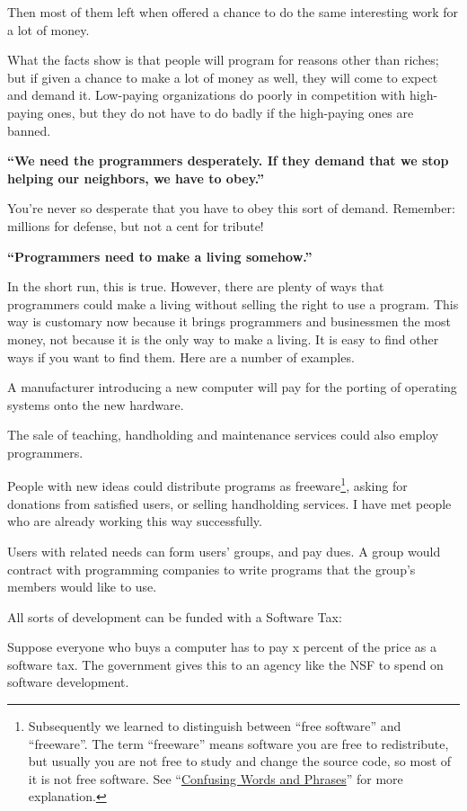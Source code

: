 Then most of them left when offered a chance to do the same interesting work for a lot of money.\par
What the facts show is that people will program for reasons other than riches; but if given a chance to make a lot of money as well, they will come to expect and demand it. Low-paying organizations do poorly in competition with high-paying ones, but they do not have to do badly if the high-paying ones are banned.\par
\textbf{“We need the programmers desperately. If they demand that we stop helping our neighbors, we have to obey.”}\par
You're never so desperate that you have to obey this sort of demand. Remember: millions for defense, but not a cent for tribute!\par
\textbf{“Programmers need to make a living somehow.”}\par
In the short run, this is true. However, there are plenty of ways that programmers could make a living without selling the right to use a program. This way is customary now because it brings programmers and businessmen the most money, not because it is the only way to make a living. It is easy to find other ways if you want to find them. Here are a number of examples.\par
A manufacturer introducing a new computer will pay for the porting of operating systems onto the new hardware.\par
The sale of teaching, handholding and maintenance services could also employ programmers.\par
People with new ideas could distribute programs as freeware\footnote{Subsequently we learned to distinguish between “free software” and “freeware”. The term “freeware” means software you are free to redistribute, but usually you are not free to study and change the source code, so most of it is not free software. See “\href{http://www.gnu.org/philosophy/words-to-avoid.html\#Freeware}{Confusing Words and Phrases}” for more explanation.}, asking for donations from satisfied users, or selling handholding services. I have met people who are already working this way successfully.\par
Users with related needs can form users' groups, and pay dues. A group would contract with programming companies to write programs that the group's members would like to use.\par
All sorts of development can be funded with a Software Tax:\par
Suppose everyone who buys a computer has to pay x percent of the price as a software tax. The government gives this to an agency like the NSF to spend on software development.\par
